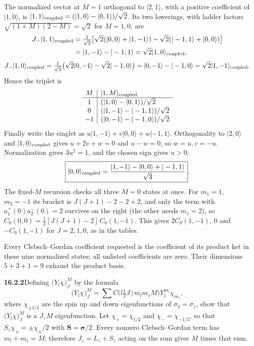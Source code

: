 The normalized vector at $M=1$ orthogonal to $|2,1\rangle$, with a
positive coefficient of $|1,0\rangle$, is
$|1,1\rangle_{\rm coupled}=(|1,0\rangle-|0,1\rangle)/\sqrt2$.
Its two lowerings, with ladder factors
$\sqrt{(1+M)(2-M)}=\sqrt2$ for $M=1,0$, are
\[
\begin{aligned}
J_-|1,1\rangle_{\rm coupled}
&=\tfrac1{\sqrt2}\bigl[\sqrt2(|0,0\rangle+|1,-1\rangle)
-\sqrt2(|-1,1\rangle+|0,0\rangle)\bigr]\\
&=|1,-1\rangle-|-1,1\rangle=\sqrt2|1,0\rangle_{\rm coupled},
\end{aligned}
\]
\[
J_-|1,0\rangle_{\rm coupled}
=\tfrac1{\sqrt2}\bigl(\sqrt2|0,-1\rangle-\sqrt2|-1,0\rangle\bigr)
=|0,-1\rangle-|-1,0\rangle
=\sqrt2|1,-1\rangle_{\rm coupled}.
\]
Hence the triplet is
\[
\begin{array}{c|l}
M&|1,M\rangle_{\rm coupled}\\ \hline
1&(|1,0\rangle-|0,1\rangle)/\sqrt2\\
0&(|1,-1\rangle-|-1,1\rangle)/\sqrt2\\
-1&(|0,-1\rangle-|-1,0\rangle)/\sqrt2
\end{array}
\]
Finally write the singlet as
$u|1,-1\rangle+v|0,0\rangle+w|-1,1\rangle$.
Orthogonality to $|2,0\rangle$ and $|1,0\rangle_{\rm coupled}$ gives
$u+2v+w=0$ and $u-w=0$, so $w=u,v=-u$.
Normalization gives $3u^2=1$, and the chosen sign gives $u>0$:
\[
\boxed{|0,0\rangle_{\rm coupled}
=\frac{|1,-1\rangle-|0,0\rangle+|-1,1\rangle}{\sqrt3}}.
\]
The fixed-$M$ recursion checks all three $M=0$ states at once. For
$m_1=1$, $m_2=-1$ its bracket is $J(J+1)-2-2+2$, and only the term
with $a_1^+(0)a_2^-(0)=2$ survives on the right (the other needs
$m_1=2$), so
$C_0(0,0)=\tfrac12[J(J+1)-2]\,C_0(1,-1)$. This gives $2C_0(1,-1)$,
$0$ and $-C_0(1,-1)$ for $J=2,1,0$, as in the tables.

Every Clebsch--Gordan coefficient requested is the coefficient of its
product ket in these nine normalized states; all unlisted coefficients
are zero. Their dimensions $5+3+1=9$ exhaust the product basis.

\par\bigskip
\noindent\textbf{16.2.2}\quad Defining $\big(Y_{l}\chi\big)_{J}^{M}$
by the formula
\[
\big(Y_{l}\chi\big)_{J}^{M}
=\sum C\big(l\tfrac{1}{2}J\,\big|\,m_{l}m_{s}M\big)
Y_{l}^{m_{l}}\chi_{m_{s}},
\]
where $\chi_{\pm1/2}$ are the spin up and down eigenfunctions of
$\sigma_{3}=\sigma_{z}$, show that $\big(Y_{l}\chi\big)_{J}^{M}$ is a
$J,M$ eigenfunction.
\solution
Let $\chi_+=\chi_{1/2}$ and $\chi_-=\chi_{-1/2}$, so that
$S_z\chi_\pm=\pm\chi_\pm/2$ with $\mathbf S=\boldsymbol\sigma/2$.
Every nonzero Clebsch--Gordan term has $m_l+m_s=M$; therefore
$J_z=L_z+S_z$ acting on the sum gives $M$ times that sum.

